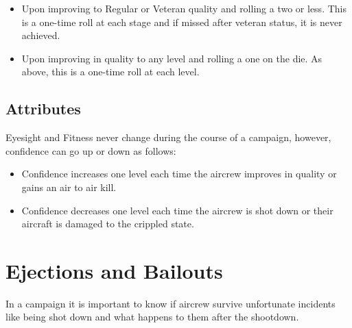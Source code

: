 \begin{advancedrules}
\begin{itemize}
        \item {} Upon improving to Regular or Veteran quality and rolling a two or less. This is a one-time roll at each stage and if missed after veteran status, it is never achieved.

        \item {} Upon improving in quality to any level and rolling a one on the die. As above, this is a one-time roll at each level.

    \end{itemize}

    \subsection{Attributes} Eyesight and Fitness never change during the course of a campaign, however, confidence can go up or down as follows:
    \begin{itemize}

        \item Confidence increases one level each time the aircrew improves in quality or gains an air to air kill.

        \item Confidence decreases one level each time the aircrew is shot down or their aircraft is damaged to the crippled state.

    \end{itemize}


    \section{Ejections and Bailouts}
    \label{rule:ejections-and-bail-outs}
    \label{rule:emergency-egress}


    In a campaign it is important to know if aircrew survive unfortunate incidents like being shot down and what happens to them after the shootdown.


\end{advancedrules}
